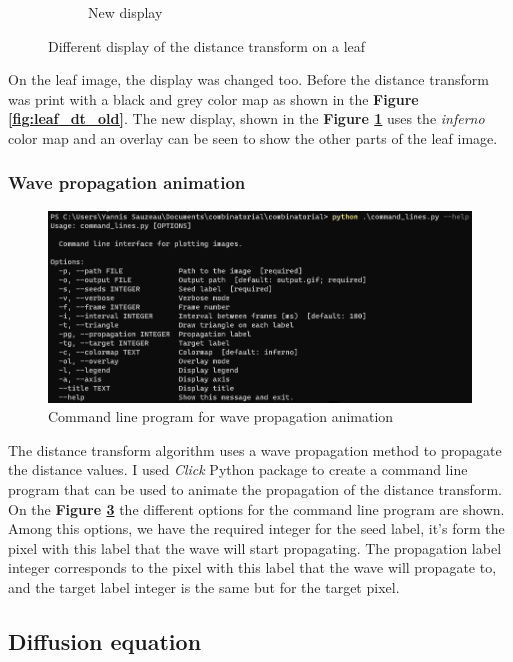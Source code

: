 \begin{figure}[ht]
\begin{subfigure}{0.54\textwidth}
        \caption{New display}
        \label{fig:leaf_dt_new}
    \end{subfigure}
    \caption{Different display of the distance transform on a leaf}
    \label{fig:leaf_dt}
\end{figure}

On the leaf image, the display was changed too. Before the distance transform
was print with a black and grey color map as shown in the \textbf{Figure \ref{fig:leaf_dt_old}}. 
The new display, shown in the \textbf{Figure \ref{fig:leaf_dt_new}} uses the 
\textit{inferno} color map and an overlay can be seen to show the other parts of the 
leaf image.

\subsubsection{Wave propagation animation}

\begin{figure}[ht]
    \centering
    \includegraphics[width=\textwidth]{figures/cli.png}
    \caption{Command line program for wave propagation animation}
    \label{fig:cli}
\end{figure}

The distance transform algorithm uses a wave propagation method to propagate the
distance values. I used \textit{Click} \cite{CLICK} Python package to create a
command line program that can be used to animate the propagation of the distance
transform. On the \textbf{Figure \ref{fig:cli}} the different options for the command line
program are shown. Among this options, we have the required integer for the seed
label, it's form the pixel with this label that the wave will start propagating.
The propagation label integer corresponds to the pixel with this label that the wave
will propagate to, and the target label integer is the same but for the target pixel.

\subsection{Diffusion equation}

